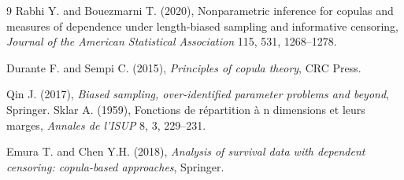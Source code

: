 \documentclass[twoside]{article}
\begin{document}
\begin{thebibliography}{9}
Rabhi Y. and Bouezmarni T. (2020), Nonparametric inference for copulas and measures of dependence under length-biased sampling and informative censoring, {\it Journal of the American Statistical Association} 115, 531, 1268--1278.  
   
Durante F. and Sempi C. (2015), {\it Principles of copula theory}, CRC Press.

Qin J. (2017), {\it Biased sampling, over-identified parameter problems and beyond}, Springer.
Sklar A. (1959), Fonctions de r\'epartition \`a n dimensions et leurs marges, {\it Annales de l'ISUP} 8, 3, 229--231.

Emura T. and Chen Y.H. (2018), {\it Analysis of survival data with dependent censoring: copula-based approaches}, Springer.
\end{thebibliography}
 
\end{document}
